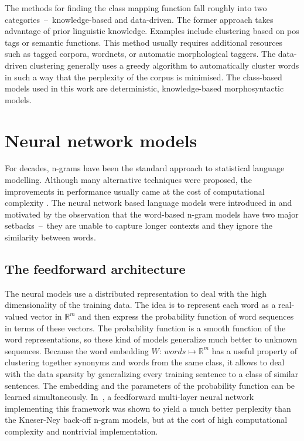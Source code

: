 	The methods for finding the class mapping function fall roughly into two categories~--~\mbox{knowledge-based} and \mbox{data-driven}. The former approach takes advantage of prior linguistic knowledge. Examples include clustering based on \gls{pos} tags or semantic functions. This method usually requires additional resources such as tagged corpora, wordnets, or automatic morphological taggers. The \mbox{data-driven} clustering generally uses a greedy algorithm to automatically cluster words in such a way that the perplexity of the corpus is minimised. The \mbox{class-based} models used in this work are deterministic, \mbox{knowledge-based} morphosyntactic models.
	\section{Neural network models}
	\label{section:rnn}
	For decades, n-grams have been the standard approach to statistical language modelling. Although many alternative techniques were proposed, the improvements in performance usually came at the cost of computational complexity \cite{mikolov2011rnnlm}. The neural network based language models were introduced in \cite{bengio2003neural} and motivated by the observation that the \mbox{word-based} \mbox{n-gram} models have two major setbacks~--~they are unable to capture longer contexts and they ignore the similarity between words. 
	\subsection{The feedforward architecture}	
The neural models use a distributed representation to deal with the high dimensionality of the training data. The idea is to represent each word as a \mbox{real-valued} vector in $\mathbb{R}^{m}$ and then express the probability function of word sequences in terms of these vectors. The probability function is a smooth function of the word representations, so these kind of models generalize much better to unknown sequences. Because the word embedding $W$: $words \mapsto \mathbb{R}^{m}$ has a useful property of clustering together synonyms and words from the same class, it allows to deal with the data sparsity by generalizing every training sentence to a class of similar sentences. The embedding and the parameters of the probability function can be learned simultaneously. In~\cite{bengio2003neural}, a feedforward multi-layer neural network implementing this framework was shown to yield a much better perplexity than the \mbox{Kneser-Ney} back-off \mbox{n-gram} models, but at the cost of high computational complexity and nontrivial implementation.
